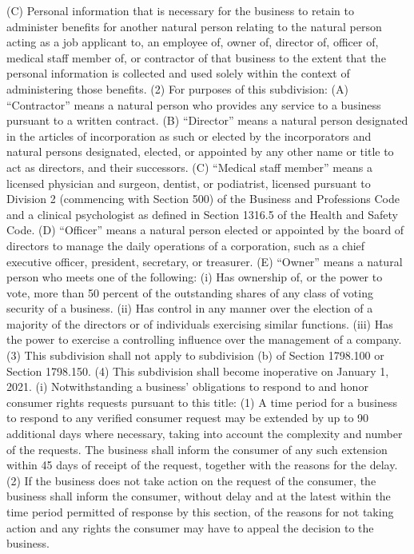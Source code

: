 (C) Personal information that is necessary for the business to retain to administer benefits for another natural person relating to the natural person acting as a job applicant to, an employee of, owner of, director of, officer of, medical staff member of, or contractor of that business to the extent that the personal information is collected and used solely within the context of administering those benefits.
(2) For purposes of this subdivision:
(A) “Contractor” means a natural person who provides any service to a business pursuant to a written contract.
(B) “Director” means a natural person designated in the articles of incorporation as such or elected by the incorporators and natural persons designated, elected, or appointed by any other name or title to act as directors, and their successors.
(C) “Medical staff member” means a licensed physician and surgeon, dentist, or podiatrist, licensed pursuant to Division 2 (commencing with Section 500) of the Business and Professions Code and a clinical psychologist as defined in Section 1316.5 of the Health and Safety Code.
(D) “Officer” means a natural person elected or appointed by the board of directors to manage the daily operations of a corporation, such as a chief executive officer, president, secretary, or treasurer.
(E) “Owner” means a natural person who meets one of the following:
(i) Has ownership of, or the power to vote, more than 50 percent of the outstanding shares of any class of voting security of a business.
(ii) Has control in any manner over the election of a majority of the directors or of individuals exercising similar functions.
(iii) Has the power to exercise a controlling influence over the management of a company.
(3) This subdivision shall not apply to subdivision (b) of Section 1798.100 or Section 1798.150.
(4) This subdivision shall become inoperative on January 1, 2021.
(i) Notwithstanding a business’ obligations to respond to and honor consumer rights requests pursuant to this title:
(1) A time period for a business to respond to any verified consumer request may be extended by up to 90 additional days where necessary, taking into account the complexity and number of the requests. The business shall inform the consumer of any such extension within 45 days of receipt of the request, together with the reasons for the delay.
(2) If the business does not take action on the request of the consumer, the business shall inform the consumer, without delay and at the latest within the time period permitted of response by this section, of the reasons for not taking action and any rights the consumer may have to appeal the decision to the business.
